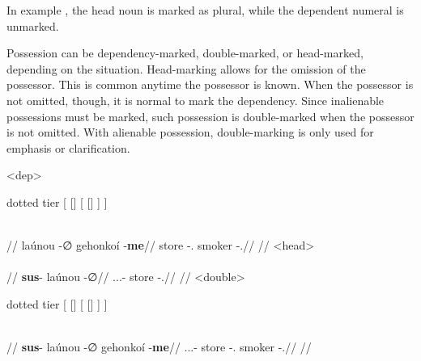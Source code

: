 In example , the head noun  is marked as plural, while the dependent numeral  is unmarked.


Possession can be dependency-marked, double-marked, or head-marked, depending on the situation\autocite{wals-24}. Head-marking allows for the omission of the possessor. This is common anytime the possessor is known. When the possessor is not omitted, though, it is normal to mark the dependency. Since inalienable possessions must be marked, such possession is double-marked when the possessor is not omitted. With alienable possession, double-marking is only used for emphasis or clarification.

	\a<dep>\begingl
		\glpreamble{}\\
		\begin{forest} dotted tier
			[
				[]
				[
					[]
				]
			]
		\end{forest}\\
		//
		\gla laúnou -∅ gehonkoí -\textbf{me}//
		\glb store -\Dir.\Sg{} smoker -\Gen.\Sg//
		\glft {}//
	\endgl
	\a<head>\begingl
		\glpreamble{}\\
		\\
		//
		\gla \textbf{sus}- laúnou -∅//
		\glb \Tps.\Prox.\Poss.\Ali- store -\Dir.\Sg//
		\glft {}//
	\endgl
	\a<double>\begingl
		\glpreamble{}\\
		\begin{forest} dotted tier
			[
				[]
				[
					[]
				]
			]
		\end{forest}\\
		//
		\gla \textbf{sus}- laúnou -∅ gehonkoí -\textbf{me}//
		\glb \Tps.\Prox.\Poss.\Ali- store -\Dir.\Sg{} smoker -\Gen.\Sg//
		\glft {}//
	\endgl
\xe

